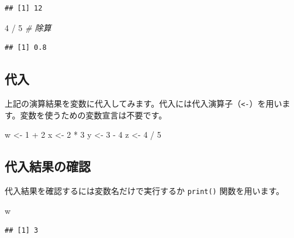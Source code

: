 \documentclass[
  12pt,
]{book}
\newenvironment{Shaded}{\begin{snugshade}}{\end{snugshade}}
\newcommand{\CommentTok}[1]{\textcolor[rgb]{0.56,0.35,0.01}{\textit{#1}}}
\newcommand{\DecValTok}[1]{\textcolor[rgb]{0.00,0.00,0.81}{#1}}
\newcommand{\NormalTok}[1]{#1}
\newcommand{\OtherTok}[1]{\textcolor[rgb]{0.56,0.35,0.01}{#1}}
\newcommand{\SpecialCharTok}[1]{\textcolor[rgb]{0.00,0.00,0.00}{#1}}
\begin{document}
\begin{verbatim}
## [1] 12
\end{verbatim}

\begin{Shaded}
\begin{Highlighting}[]
\DecValTok{4} \SpecialCharTok{/} \DecValTok{5}     \CommentTok{\# 除算}
\end{Highlighting}
\end{Shaded}

\begin{verbatim}
## [1] 0.8
\end{verbatim}

\hypertarget{ux4ee3ux5165}{%
\subsection{代入}\label{ux4ee3ux5165}}

上記の演算結果を変数に代入してみます。代入には代入演算子（\texttt{\textless{}-}）を用います。変数を使うための変数宣言は不要です。

\begin{Shaded}
\begin{Highlighting}[]
\NormalTok{w }\OtherTok{\textless{}{-}} \DecValTok{1} \SpecialCharTok{+} \DecValTok{2}
\NormalTok{x }\OtherTok{\textless{}{-}} \DecValTok{2} \SpecialCharTok{*} \DecValTok{3}
\NormalTok{y }\OtherTok{\textless{}{-}} \DecValTok{3} \SpecialCharTok{{-}} \DecValTok{4}
\NormalTok{z }\OtherTok{\textless{}{-}} \DecValTok{4} \SpecialCharTok{/} \DecValTok{5}
\end{Highlighting}
\end{Shaded}

\hypertarget{ux4ee3ux5165ux7d50ux679cux306eux78baux8a8d}{%
\subsection{代入結果の確認}\label{ux4ee3ux5165ux7d50ux679cux306eux78baux8a8d}}

代入結果を確認するには変数名だけで実行するか \texttt{print()} 関数を用います。

\begin{Shaded}
\begin{Highlighting}[]
\NormalTok{w}
\end{Highlighting}
\end{Shaded}

\begin{verbatim}
## [1] 3
\end{verbatim}
\end{document}
